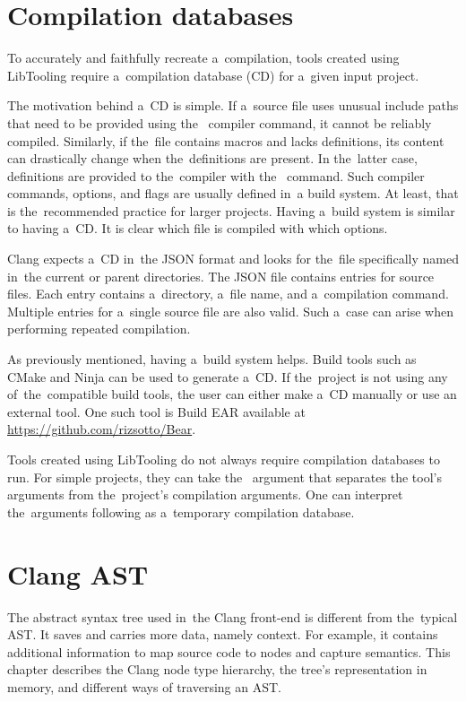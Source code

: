 \section{Compilation databases}

To accurately and faithfully recreate a~compilation, tools created using 
LibTooling require a~compilation database (CD) \citep{cd:online} 
for a~given input project.

The motivation behind a~CD is simple.
If a~source file uses unusual include paths that need to be provided 
using the~ compiler command, it cannot be reliably compiled.
Similarly, if the~file contains macros and lacks definitions, its content 
can drastically change when the~definitions are present.
In the~latter case, definitions are provided to the~compiler 
with the~ command.
Such compiler commands, options, and flags are usually defined in~a build 
system.
At least, that is the~recommended practice for larger projects.
Having a~build system is similar to having a~CD.
It is clear which file is compiled with which options.

Clang expects a~CD in~the JSON format and looks for the~file specifically
named   in~the current or parent 
directories.
The JSON file contains entries for source files.
Each entry contains a~directory, a~file name, and a~compilation command.
Multiple entries for a~single source file are also valid.
Such a~case can arise when performing repeated compilation.

As previously mentioned, having a~build system helps.
Build tools such as CMake and Ninja can be used to generate a~CD.
If the~project is not using any of~the~compatible build tools, 
the user can either make a~CD manually or use an external tool.
One such tool is Build EAR available at \url{https://github.com/rizsotto/Bear}.

Tools created using LibTooling do not always require compilation databases 
to run.
For simple projects, they can take the~\icode{-{}-} argument that separates 
the tool's arguments from the~project's compilation arguments.
One can interpret the~arguments following \icode{-{}-} as a~temporary
compilation database.

\section{Clang AST}

The abstract syntax tree used in~the Clang front-end \citep{ast:online}
is different from the~typical AST. 
It saves and carries more data, namely context.  
For example, it contains additional information to map source 
code to nodes and capture semantics. 
This chapter describes the Clang node type hierarchy, the tree's 
representation in memory, and different ways of traversing an AST.
